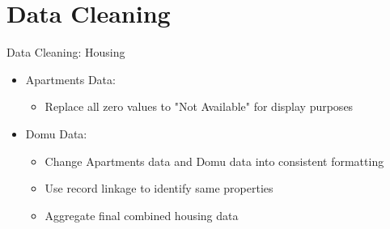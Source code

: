\documentclass{beamer}
\begin{document}
\section{Data Cleaning}

\begin{frame}{Data Cleaning: Housing}
    \begin{itemize}
        \item Apartments Data:
        \begin{itemize}
            \item Replace all zero values to "Not Available" for display purposes
        \end{itemize}
        \item Domu Data:
        \begin{itemize}
            \item Change Apartments data and Domu data into consistent formatting
            \item Use record linkage to identify same properties
            \item Aggregate final combined housing data
        \end{itemize}
    \end{itemize}
\end{frame}
\end{document}
